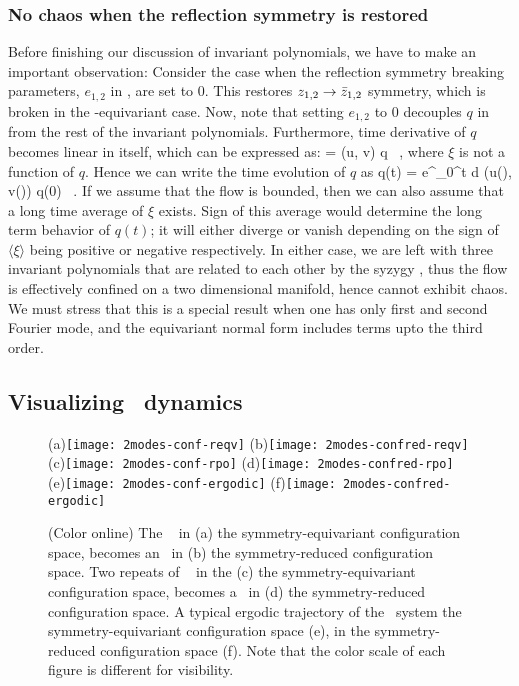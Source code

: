 \subsubsection{No chaos when the reflection symmetry is restored}
\label{s:dfsafs}

Before finishing our discussion of invariant polynomials, we have to make an
important observation: Consider the case when the reflection symmetry breaking
parameters, $e_{1,2}$ in , are set to $0$. This restores 
$z_{1,2} \rightarrow \bar{z}_{1,2}$ symmetry, which is broken in 
the -equivariant case. Now, note that setting $ e_{1,2} $ to $0$ 
decouples $q$ in  from the rest of the invariant polynomials.
Furthermore, time derivative of $q$ becomes linear in itself, which can be
expressed as:
\beq
     = \xi (u, v) q \, , 
where $\xi$ is not a function of $q$. Hence we can write
the time evolution of $q$ as
\beq
    q(t) =  e^{\int_0^t d \tau \xi (u(\tau), v(\tau))} q(0) \, . 
If we assume that the flow is bounded, then we can also assume that a long time 
average of $\xi$ exists. Sign of this average would determine the long term 
behavior of $q(t)$; it will either diverge or vanish depending on the sign of 
$\langle \xi \rangle$ being positive or negative respectively. In either case, we 
are left with three invariant polynomials that are related to each other by the 
syzygy , thus the flow is effectively confined on a two dimensional
manifold, hence cannot exhibit chaos. We must stress that this is a special result
when one has only first and second Fourier mode, and the equivariant normal form 
includes terms upto the third order. 

\subsection{Visualizing \twomode\ dynamics}
\label{s:visual}

\begin{figure*}%
\centering
(a)\!\!\texttt{[image: 2modes-conf-reqv]}%
(b)\!\!\texttt{[image: 2modes-confred-reqv]}%
(c)\!\!\texttt{[image: 2modes-conf-rpo]}%
(d)\!\!\texttt{[image: 2modes-confred-rpo]}%
(e)\!\!\texttt{[image: 2modes-conf-ergodic]}%
(f)\!\!\texttt{[image: 2modes-confred-ergodic]}%
\caption{(Color online)
The \reqv\ \REQV{}{} in
 (a) the symmetry-equivariant configuration space, becomes an \eqv\ in
 (b) the symmetry-reduced configuration space.
Two repeats of \rpo\  in the 
 (c) the symmetry-equivariant configuration space, becomes a \po\ in
 (d) the symmetry-reduced configuration space.
A typical ergodic trajectory of the \twomode\ system 
 the symmetry-equivariant configuration space (e), 
 in the symmetry-reduced configuration space (f).
Note that the color scale of each figure is different
for visibility. 
}
\label{fig:2modes-conf}
\end{figure*}

